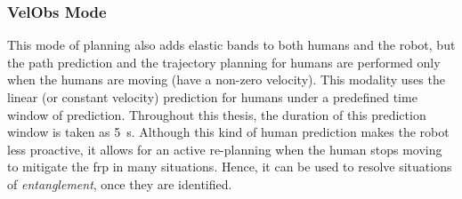\subsubsection{VelObs Mode}
This mode of planning also adds elastic bands to both humans and the robot, but the path prediction and the trajectory planning for humans are performed only when the humans are moving (have a non-zero velocity). This modality uses the linear (or constant velocity) prediction for humans under a predefined time window of prediction. Throughout this thesis, the duration of this prediction window is taken as \SI{5}{\second}. Although this kind of human prediction makes the robot less proactive, it allows for an active re-planning when the human stops moving to mitigate the \acrshort{frp} in many situations. Hence, it can be used to resolve situations of \textit{entanglement}, once they are identified.

